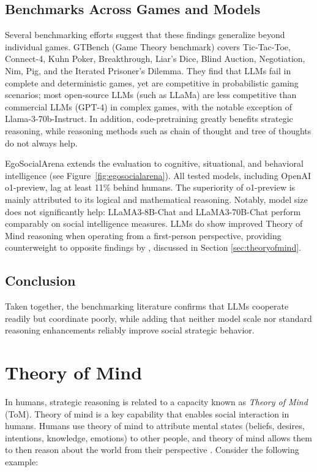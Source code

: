 \subsection{Benchmarks Across Games and Models} Several benchmarking efforts suggest that these findings generalize beyond individual games. GTBench (Game Theory benchmark) \citep{duan2024gtbench} covers Tic-Tac-Toe, Connect-4, Kuhn Poker, Breakthrough, Liar's Dice, Blind Auction, Negotiation, Nim, Pig, and the Iterated Prisoner's Dilemma. They find that LLMs fail in complete and deterministic games, yet are competitive in probabilistic gaming scenarios; most open-source LLMs (such as LLaMa) are less competitive than commercial LLMs (GPT-4) in complex games, with the notable exception of Llama-3-70b-Instruct. In addition, code-pretraining greatly benefits strategic reasoning, while  reasoning methods such as chain of thought  and tree of thoughts do not always help.

EgoSocialArena \citep{hou2024entering} extends the evaluation to cognitive, situational, and behavioral intelligence (see Figure~\ref{fig:egosocialarena}). All tested models, including OpenAI o1-preview, lag at least 11\% behind humans. The superiority of o1-preview is mainly attributed to its logical and mathematical reasoning. Notably, model size does not significantly help: LLaMA3-8B-Chat and LLaMA3-70B-Chat perform comparably on social intelligence measures. LLMs do show improved Theory of Mind reasoning when operating from a first-person perspective, providing counterweight to opposite findings by \citet{kim-etal-2023-fantom}, discussed in Section \ref{sec:theoryofmind}. 

\subsection{Conclusion}
Taken together, the benchmarking literature confirms that LLMs cooperate readily but coordinate poorly, while adding that neither model scale nor standard reasoning enhancements reliably improve social strategic behavior. 

\section{Theory of Mind} \label{sec:tom}\label{sec:theoryofmind}
In humans, strategic reasoning is related to a capacity known as \emph{Theory of Mind} (ToM). Theory of mind  is a key capability that enables social interaction in humans. Humans use theory of mind to attribute mental states (beliefs, desires, intentions, knowledge, emotions) to other people, and theory of mind allows them to then reason about the world from their perspective \citep{premack1978does, apperly2011mindreaders}. Consider the following example:

